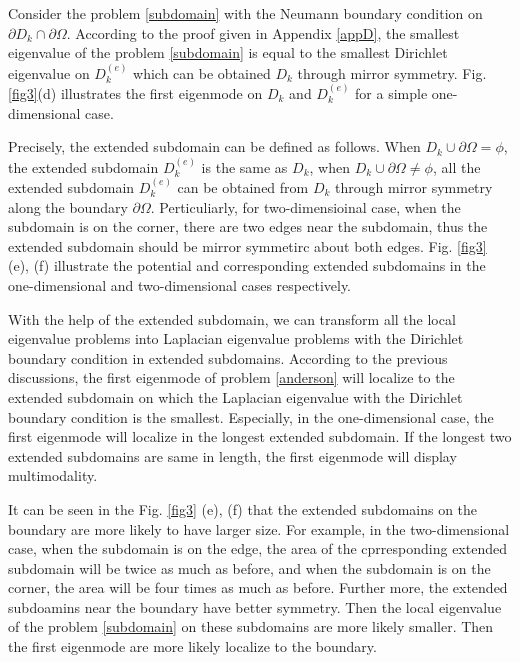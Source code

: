 \documentclass[a4paper,11pt]{article}
\begin{document}
Consider the problem \eqref{subdomain} with the Neumann boundary condition on $\partial D_k \cap \partial \Omega$. According to the proof given in Appendix \ref{appD}, the smallest eigenvalue of the problem \eqref{subdomain} is equal to the smallest Dirichlet eigenvalue on $D_k^{(e)}$ which can be obtained $D_k$ through mirror symmetry. Fig. \ref{fig3}(d) illustrates the first eigenmode on $D_k$ and $D_k^{(e)}$ for a simple one-dimensional case.

Precisely, the extended subdomain can be defined as follows. When $D_k \cup \partial \Omega = \phi$, the extended subdomain $D_k^{(e)}$ is the same as $D_k$, when $D_k \cup \partial \Omega \neq \phi$, all the extended subdomain $D_k^{(e)}$ can be obtained from $D_k$ through mirror symmetry along the boundary $\partial \Omega$. Perticuliarly, for two-dimensioinal case, when the subdomain is on the corner, there are two edges near the subdomain, thus the extended subdomain should be mirror symmetirc about both edges. Fig. \ref{fig3} (e), (f) illustrate the potential and corresponding extended subdomains in the one-dimensional and two-dimensional cases respectively.

With the help of the extended subdomain, we can transform all the local eigenvalue problems into Laplacian eigenvalue problems with the Dirichlet boundary condition in extended subdomains. According to the previous discussions, the first eigenmode of problem \eqref{anderson} will localize to the extended subdomain on which the Laplacian eigenvalue with the Dirichlet boundary condition is the smallest. Especially, in the one-dimensional case, the first eigenmode will localize in the longest extended subdomain. If the longest two extended subdomains are same in length, the first eigenmode will display multimodality.

It can be seen in the Fig. \ref{fig3} (e), (f) that the extended subdomains on the boundary are more likely to have larger size. For example, in the two-dimensional case, when the subdomain is on the edge, the area of the cprresponding extended subdomain will be twice as much as before, and when the subdomain is on the corner, the area will be four times as much as before. Further more, the extended subdoamins near the boundary have better symmetry. Then the local eigenvalue of the problem \eqref{subdomain} on these subdomains are more likely smaller. Then the first eigenmode are more likely localize to the boundary.
\end{document}
